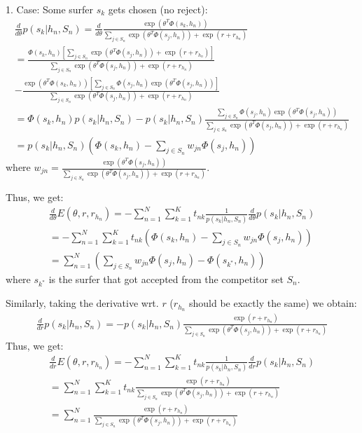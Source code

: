 \documentclass[10pt]{article}
\begin{document}
1. Case: Some surfer $s_k$ gets chosen (no reject):
\begin{eqnarray}
\frac{d}{d \theta} p(s_k | h_n, S_n) = \frac{d}{d \theta} \frac{\exp(\theta^T \Phi(s_k,h_n))}{\sum_{j \in S_n} \exp(\theta^T \Phi(s_j,h_n)) + \exp(r + r_{h_n})} \\
= \frac{\Phi(s_k,h_n) [\sum_{j \in S_n} \exp(\theta^T \Phi(s_j,h_n)) + \exp(r + r_{h_n})]}{\sum_{j \in S_n} \exp(\theta^T \Phi(s_j,h_n)) + \exp(r + r_{h_n})} \\
- \frac{\exp(\theta^T \Phi(s_k,h_n)) [\sum_{j \in S_n} \Phi(s_j,h_n) \exp(\theta^T \Phi(s_j,h_n))]}{\sum_{j \in S_n} \exp(\theta^T \Phi(s_j,h_n)) + \exp(r + r_{h_n})}\\
= \Phi(s_k,h_n) p(s_k | h_n, S_n) - p(s_k | h_n, S_n) \frac{\sum_{j \in S_n} \Phi(s_j,h_n) \exp(\theta^T \Phi(s_j,h_n))}{\sum_{j \in S_n} \exp(\theta^T \Phi(s_j,h_n)) + \exp(r + r_{h_n})}\\
= p(s_k | h_n, S_n) (\Phi(s_k,h_n) - \sum_{j \in S_n} w_{jn} \Phi(s_j,h_n))
\end{eqnarray}
where $w_{jn}=\frac{\exp(\theta^T \Phi(s_j,h_n))}{\sum_{j \in S_n} \exp(\theta^T \Phi(s_j,h_n)) + \exp(r + r_{h_n})}$.

Thus, we get:
\begin{eqnarray}
\frac{d}{d \theta} E(\theta, r, r_{h_n}) = - \sum_{n=1}^N \sum_{k=1}^K t_{nk} \frac{1}{p(s_k | h_n, S_n)} \frac{d}{d \theta} p(s_k | h_n, S_n)\\
= - \sum_{n=1}^N \sum_{k=1}^K t_{nk} (\Phi(s_k,h_n) - \sum_{j \in S_n} w_{jn} \Phi(s_j,h_n)) \\
= \sum_{n=1}^N (\sum_{j \in S_n} w_{jn} \Phi(s_j,h_n) - \Phi(s_{k^*},h_n))
\end{eqnarray}
where $s_{k^*}$ is the surfer that got accepted from the competitor set $S_n$.

Similarly, taking the derivative wrt. $r$ ($r_{h_n}$ should be exactly the same) we obtain:
\begin{eqnarray}
\frac{d}{d r} p(s_k | h_n, S_n) = -  p(s_k | h_n, S_n)  \frac{\exp(r + r_{h_n})}{\sum_{j \in S_n} \exp(\theta^T \Phi(s_j,h_n)) + \exp(r + r_{h_n})}
\end{eqnarray}
Thus, we get:
\begin{eqnarray}
\frac{d}{d r} E(\theta, r, r_{h_n}) = - \sum_{n=1}^N \sum_{k=1}^K t_{nk} \frac{1}{p(s_k | h_n, S_n)} \frac{d}{d r} p(s_k | h_n, S_n)\\
= \sum_{n=1}^N \sum_{k=1}^K t_{nk} \frac{\exp(r + r_{h_n})}{\sum_{j \in S_n} \exp(\theta^T \Phi(s_j,h_n)) + \exp(r + r_{h_n})} \\
= \sum_{n=1}^N \frac{\exp(r + r_{h_n})}{\sum_{j \in S_n} \exp(\theta^T \Phi(s_j,h_n)) + \exp(r + r_{h_n})}
\end{eqnarray}
\end{document}

